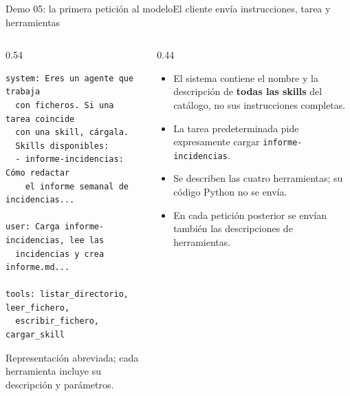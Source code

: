 \begin{frame}[fragile]{Demo 05: la primera petición al modelo}{El cliente envía instrucciones, tarea y herramientas}
	\begin{columns}[T]
		\begin{column}{0.54\textwidth}
			\begin{lstlisting}[language={}]
system: Eres un agente que trabaja
  con ficheros. Si una tarea coincide
  con una skill, cárgala.
  Skills disponibles:
  - informe-incidencias: Cómo redactar
    el informe semanal de incidencias...

user: Carga informe-incidencias, lee las
  incidencias y crea informe.md...

tools: listar_directorio, leer_fichero,
  escribir_fichero, cargar_skill
\end{lstlisting}
			{\scriptsize Representación abreviada; cada herramienta incluye su descripción y parámetros.}
		\end{column}
		\begin{column}{0.44\textwidth}
			\footnotesize
			\begin{itemize}
				\setlength{\itemsep}{1pt}
				\item El sistema contiene el nombre y la descripción de \textbf{todas las skills} del catálogo, no sus instrucciones completas.
				\item La tarea predeterminada pide expresamente cargar \texttt{informe-incidencias}.
				\item Se describen las cuatro herramientas; su código Python no se envía.
				\item En cada petición posterior se envían también las descripciones de herramientas.
			\end{itemize}
		\end{column}
	\end{columns}
\end{frame}

